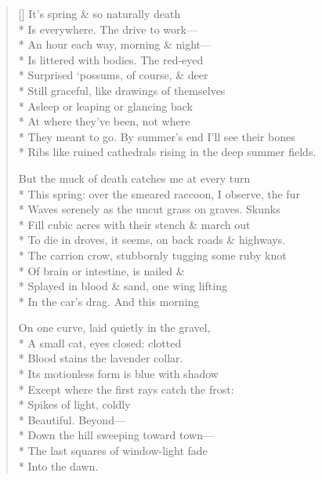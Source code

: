 \label{ch:naturally_death}
\settowidth{\versewidth}{Ribs like ruined cathedrals rising in the deep summer fields.}
\begin{verse}[\versewidth]
It's spring \& so naturally death\\*
Is everywhere. The drive to work---\\*
An hour each way, morning \& night---\\*
Is littered with bodies. The red-eyed\\*
Surprised `possums, of course, \& deer\\*
Still graceful, like drawings of themselves\\*
Asleep or leaping or glancing back\\*
At where they've been, not where\\*
They meant to go. By summer's end I'll see their bones\\*
Ribs like ruined cathedrals rising in the deep summer fields.

But the muck of death catches me at every turn \\*
This spring: over the smeared raccoon, I observe, the fur\\*
Waves serenely as the uncut grass on graves. Skunks\\*
Fill cubic acres with their stench \& march out\\*
To die in droves, it seems, on back roads \& highways.\\*
The carrion crow, stubbornly tugging some ruby knot\\*
Of brain or intestine, is nailed \&\\*
Splayed in blood \& sand, one wing lifting\\*
In the car's drag. And this morning

On one curve, laid quietly in the gravel,\\*
A small cat, eyes closed: clotted \\*
Blood stains the lavender collar.\\*
Its motionless form is blue with shadow\\*
Except where the first rays catch the frost:\\*
Spikes of light, coldly\\*
Beautiful.  Beyond---\\*
Down the hill sweeping toward town---\\*
The last squares of window-light fade\\*
Into the dawn.


\end{verse}
